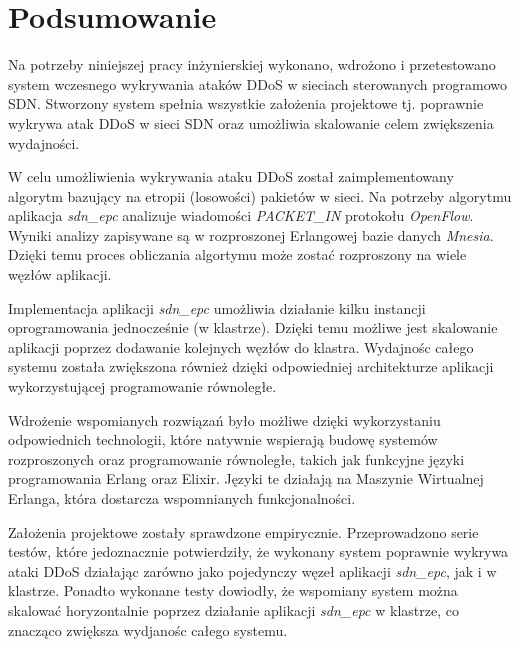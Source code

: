 \chapter{Podsumowanie}

Na potrzeby niniejszej pracy inżynierskiej wykonano, wdrożono i przetestowano
system wczesnego wykrywania ataków DDoS w sieciach sterowanych programowo SDN.
Stworzony system spełnia wszystkie założenia projektowe tj. poprawnie wykrywa
atak DDoS w sieci SDN oraz umożliwia skalowanie celem zwiększenia wydajności.

W celu umożliwienia wykrywania ataku DDoS został zaimplementowany algorytm
bazujący na etropii (losowości) pakietów w sieci. Na potrzeby algorytmu
aplikacja \textit{sdn\_epc} analizuje wiadomości \textit{PACKET\_IN} protokołu
\textit{OpenFlow}. Wyniki analizy zapisywane są w rozproszonej Erlangowej bazie
danych \textit{Mnesia}. Dzięki temu proces obliczania algortymu może zostać
rozproszony na wiele węzłów aplikacji.

Implementacja aplikacji \textit{sdn\_epc} umożliwia działanie kilku instancji
oprogramowania jednocześnie (w klastrze). Dzięki temu możliwe jest skalowanie
aplikacji poprzez dodawanie kolejnych węzłów do klastra. Wydajnośc całego
systemu została zwiększona również dzięki odpowiedniej architekturze aplikacji
wykorzystującej programowanie równoległe.

Wdrożenie wspomianych rozwiązań było możliwe dzięki wykorzystaniu odpowiednich
technologii, które natywnie wspierają budowę systemów rozproszonych oraz
programowanie równoległe, takich jak funkcyjne języki programowania Erlang oraz
Elixir. Języki te działają na Maszynie Wirtualnej Erlanga, która dostarcza
wspomnianych funkcjonalności.

Założenia projektowe zostały sprawdzone empirycznie. Przeprowadzono serie
testów, które jedoznacznie potwierdziły, że wykonany system poprawnie wykrywa
ataki DDoS działając zarówno jako pojedynczy węzeł aplikacji \textit{sdn\_epc},
jak i w klastrze. Ponadto wykonane testy dowiodły, że wspomiany system można
skalować horyzontalnie poprzez działanie aplikacji \textit{sdn\_epc} w klastrze,
co znacząco zwiększa wydjanośc całego systemu.